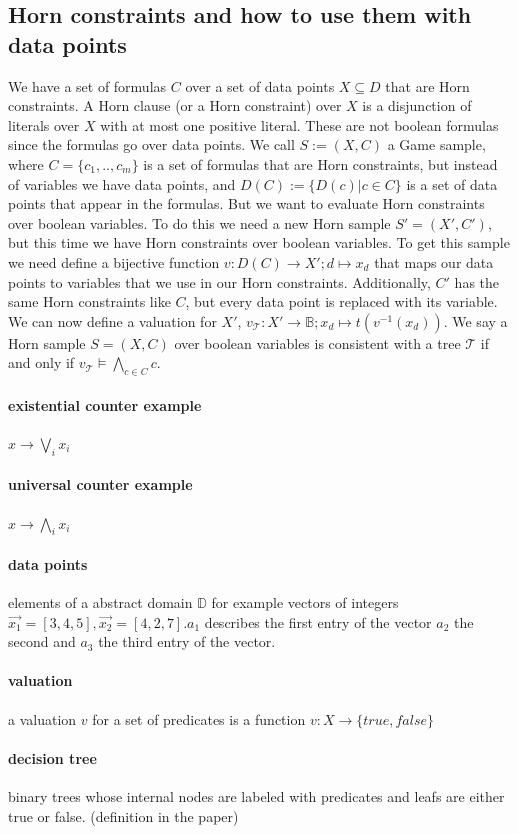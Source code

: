 \documentclass[10pt,a4paper]{article}
\theoremstyle{plain}
\theoremstyle{definition}
\begin{document}
\subsection{Horn constraints and how to use them with data points}
We have a set of formulas $C$ over a set of data points $X \subseteq D$ that are Horn constraints.
A Horn clause (or a Horn constraint) over $X$ is a disjunction of literals over $X$ with at most one positive literal.
These are not boolean formulas since the formulas go over data points. We call $S :=(X,C)$ a Game sample, where $C = \{c_1,..,c_m\}$ is a set of formulas that are Horn constraints, but instead of variables we have data points, and $D(C) := \{D(c)|c \in C\}$ is a set of data points that appear in the formulas. But we want to evaluate Horn constraints over boolean variables. To do this we need a new Horn sample $S' = (X',C')$, but this time we have Horn constraints over boolean variables. To get this sample we need define a bijective function $v: D(C) \to X';d \mapsto x_d$ that maps our data points to variables that we use in our Horn constraints. Additionally, $C'$ has the same Horn constraints like $C$, but every data point is replaced with its variable. We can now define a valuation for $X'$, $v_\mathcal{T}: X' \to \mathbb{B};x_d \mapsto t(v^{-1}(x_{d}))$. We say a Horn sample $S = (X,C)$ over boolean variables is consistent with a tree $\mathcal{T}$ if and only if $v_{\mathcal{T}} \vDash \bigwedge_{c \in C} c$.
\paragraph*{existential counter example} $x \to \bigvee_{i} x_i$
\paragraph*{universal counter example} $ x \to \bigwedge_{i} x_i$
\paragraph*{data points} elements of a abstract domain $\mathbb{D}$ for example vectors of integers
$\vec{x_1} = [3,4,5], \vec{x_2} = [4,2,7]$.$a_1$ describes the first entry of the vector $a_2$ the second and $a_3$ the third entry of the vector.
\paragraph*{valuation} a valuation $v$ for a set of predicates is a function $v: X \to \{true,false\}$
\paragraph*{decision tree} binary trees whose internal nodes are labeled with predicates and leafs are either true or false. (definition in the paper)
\end{document}
